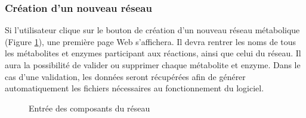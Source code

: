 \subsubsection{Création d'un nouveau réseau}

Si l'utilisateur clique sur le bouton de création d'un nouveau réseau métabolique (Figure \ref{reseau}), une première page Web s'affichera. Il devra rentrer les noms de tous les métabolites et enzymes participant aux réactions, ainsi que celui du réseau. Il aura la possibilité de valider ou supprimer chaque métabolite et enzyme. Dans le cas d'une validation, les données seront récupérées afin de générer automatiquement les fichiers nécessaires au fonctionnement du logiciel.

\pagebreak

\begin{figure}[!ht]
	\begin{center}
		\caption{Entrée des composants du réseau}
  		\label{reseau}
  	\end{center}	
\end{figure}

